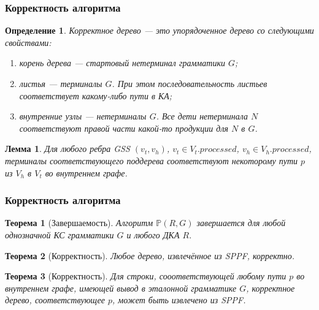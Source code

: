 \documentclass{beamer}
\newtheorem{rutheorem}{Теорема}
\newtheorem{rudefinition}{Определение}
\newtheorem{rulemma}{Лемма}
\begin{document}
\begin{frame}
    \transwipe[direction=90]
    \frametitle{Корректность алгоритма}
    \begin{rudefinition}
         \emph{Корректное дерево} --- это упорядоченное дерево со следующими свойствами:
        \begin{enumerate}
            \item корень дерева --- стартовый нетерминал грамматики $G$;
            \item листья ---  терминалы $G$. При этом последовательность листьев соответствует 
            какому-либо пути в КА;
            \item внутренние узлы --- нетерминалы $G$. Все дети нетерминала $N$ соответствуют правой части какой-то продукции для $N$ в $G$.
        \end{enumerate}
    \end{rudefinition}
    \begin{rulemma}
       Для любого ребра GSS $(v_{t}, v_{h})$, $v_{t} \in V_{t}.processed$, $v_{h} \in V_{h}.processed$, терминалы соответствующего поддерева соответствуют некоторому пути $p$ из $V_{h}$ в $V_{t}$ во внутреннем графе.
    \end{rulemma}

\end{frame}

\begin{frame}
    \transwipe[direction=90]
    \frametitle{Корректность алгоритма}
    \begin{rutheorem}[Завершаемость]
             Алгоритм $\mathbb{P}(R,G)$ завершается для любой однозначной КС грамматики $G$ и любого ДКА $R$.
    \end{rutheorem}

    \begin{rutheorem}[Корректность]
       Любое дерево, извлечённое из SPPF, корректно.
    \end{rutheorem}

    \begin{rutheorem}[Корректность]
      Для строки, сооответствующей любому пути $p$ во внутреннем графе, имеющей вывод в эталонной грамматике $G$, корректное дерево, соответствующее $p$, может быть извлечено из SPPF.
    \end{rutheorem}

\end{frame}
\end{document}

